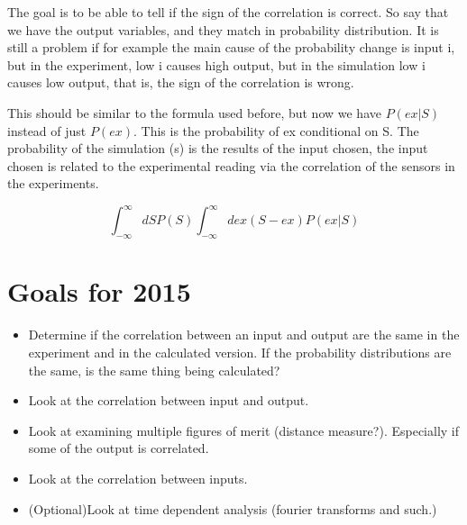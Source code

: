\documentclass{article}
\begin{document}

The goal is to be able to tell if the sign of the correlation is
correct.  So say that we have the output variables, and they match in
probability distribution.  It is still a problem if for example the
main cause of the probability change is input i, but in the
experiment, low i causes high output, but in the simulation low i
causes low output, that is, the sign of the correlation is wrong.

This should be similar to the formula used before, but now we have
$P(ex | S)$ instead of just $P(ex)$.  This is the probability of ex
conditional on S.  The probability of the simulation (s) is the
results of the input chosen, the input chosen is related to the
experimental reading via the correlation of the sensors in the
experiments.

\begin{equation}
  \int_{-\infty}^{\infty}dSP(S) \int_{-\infty}^{\infty} dex(S-ex) P(ex | S)
\end{equation}

\section{Goals for 2015}

\begin{itemize}
\item Determine if the correlation between an input and output are the same in the experiment and in the calculated version. If the probability distributions are the same, is the same thing being calculated?
\item Look at the correlation between input and output.
\item Look at examining multiple figures of merit (distance measure?).  Especially if some of the output is correlated.
\item Look at the correlation between inputs.
\item (Optional)Look at time dependent analysis (fourier transforms and such.)
\end{itemize}
\end{document}
